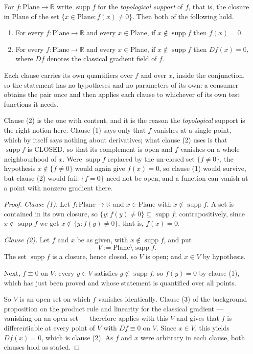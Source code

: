 \begin{lemma}
For $f\colon\mathrm{Plane}\to\mathbb{R}$ write $\operatorname{supp}f$ for the \emph{topological
support} of $f$, that is, the closure in $\mathrm{Plane}$ of the set
$\{x\in\mathrm{Plane}:f(x)\neq0\}$.  Then both of the following hold.
\begin{enumerate}
\item[(1)] For every $f\colon\mathrm{Plane}\to\mathbb{R}$ and every $x\in\mathrm{Plane}$, if
$x\notin\operatorname{supp}f$ then $f(x)=0$.
\item[(2)] For every $f\colon\mathrm{Plane}\to\mathbb{R}$ and every $x\in\mathrm{Plane}$, if
$x\notin\operatorname{supp}f$ then $Df(x)=0$, where $Df$ denotes the classical gradient field of
$f$.
\end{enumerate}

Each clause carries its own quantifiers over $f$ and over $x$, inside the conjunction, so the
statement has no hypotheses and no parameters of its own: a consumer obtains the pair once and
then applies each clause to whichever of its own test functions it needs.

Clause (2) is the one with content, and it is the reason the \emph{topological} support is the
right notion here.  Clause (1) says only that $f$ vanishes at a single point, which by itself
says nothing about derivatives; what clause (2) uses is that $\operatorname{supp}f$ is CLOSED,
so that its complement is open and $f$ vanishes on a whole neighbourhood of $x$.  Were
$\operatorname{supp}f$ replaced by the un-closed set $\{f\neq0\}$, the hypothesis
$x\notin\{f\neq0\}$ would again give $f(x)=0$, so clause (1) would survive, but clause (2) would
fail: $\{f=0\}$ need not be open, and a function can vanish at a point with nonzero gradient
there.
\end{lemma}
\begin{proof}
\emph{Clause (1).}  Let $f\colon\mathrm{Plane}\to\mathbb{R}$ and $x\in\mathrm{Plane}$ with
$x\notin\operatorname{supp}f$.  A set is contained in its own closure, so
$\{y:f(y)\neq0\}\subseteq\operatorname{supp}f$; contrapositively, since
$x\notin\operatorname{supp}f$ we get $x\notin\{y:f(y)\neq0\}$, that is, $f(x)=0$.

\medskip\noindent\emph{Clause (2).}  Let $f$ and $x$ be as given, with
$x\notin\operatorname{supp}f$, and put
\[
  V:=\mathrm{Plane}\setminus\operatorname{supp}f .
\]
The set $\operatorname{supp}f$ is a closure, hence closed, so $V$ is open; and $x\in V$ by
hypothesis.

Next, $f\equiv0$ on $V$: every $y\in V$ satisfies $y\notin\operatorname{supp}f$, so $f(y)=0$ by
clause (1), which has just been proved and whose statement is quantified over all points.

So $V$ is an open set on which $f$ vanishes identically.  Clause (3) of the background
proposition on the product rule and linearity for the classical gradient --- vanishing on an
open set --- therefore applies with this $V$ and gives that $f$ is differentiable at every point
of $V$ with $Df\equiv0$ on $V$.  Since $x\in V$, this yields $Df(x)=0$, which is clause (2).  As
$f$ and $x$ were arbitrary in each clause, both clauses hold as stated.
\end{proof}
